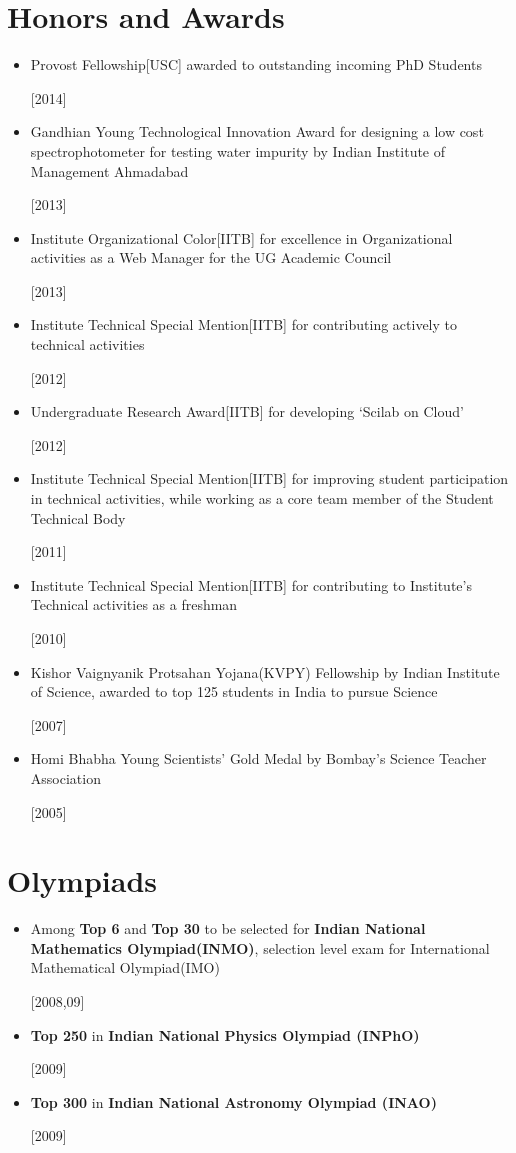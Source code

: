 \documentclass[margin,line]{res}
\newcommand{\itemtabularn}[2]{
        \renewcommand{\labelitemi}{\tiny$\blacksquare$} 
        \renewcommand{\labelitemii}{\tiny$\bullet$}
        \begin{minipage}[t]{0.89\linewidth}
            \flushleft
            {#1}
        \end{minipage}
        \begin{minipage}[p]{0.13\linewidth}
            \flushright
            {[#2]}
        \end{minipage}
    }
\renewcommand{\labelitemi}{\tiny$\blacksquare$}
\begin{document}
\begin{resume}
\section{\sc Honors and Awards} 

\begin{itemize}
\item \itemtabularn{Provost Fellowship[USC] awarded to outstanding incoming PhD Students}{2014}
\item \itemtabularn{Gandhian Young Technological Innovation Award for designing a low cost spectrophotometer for testing water impurity by Indian Institute of Management Ahmadabad}{2013}
\item \itemtabularn{Institute Organizational Color[IITB] for excellence in Organizational activities as a Web Manager for the UG Academic Council}{2013}
\item \itemtabularn{Institute Technical Special Mention[IITB] for contributing actively to technical activities}{2012}
\item \itemtabularn{Undergraduate Research Award[IITB] for developing `Scilab on Cloud'}{2012}
\item \itemtabularn{Institute Technical Special Mention[IITB] for improving student participation in technical activities, while working as a core team member of the Student Technical Body}{2011}
\item \itemtabularn{Institute Technical Special Mention[IITB] for contributing to Institute's Technical activities as a freshman}{2010}
\item \itemtabularn{Kishor Vaignyanik Protsahan Yojana(KVPY) Fellowship  by Indian Institute of Science, awarded to top 125 students in India to pursue Science}{2007}
\item \itemtabularn{Homi Bhabha Young Scientists' Gold Medal by Bombay's Science Teacher Association}{2005}
\end{itemize}


\section{\sc Olympiads}

\begin{itemize}
\item \itemtabularn{Among {\bf Top 6} and  {\bf Top 30 }  to be selected for {\bf {Indian National Mathematics Olympiad(INMO)}}, selection level exam for International Mathematical Olympiad(IMO)}{2008,09}
\item \itemtabularn{{\bf Top 250} in {\bf {Indian National Physics Olympiad (INPhO)}}}{2009}
\item \itemtabularn{{\bf Top 300} in {\bf Indian National Astronomy Olympiad (INAO)}}{2009}
\end{itemize}


\end{resume}
\end{document}
